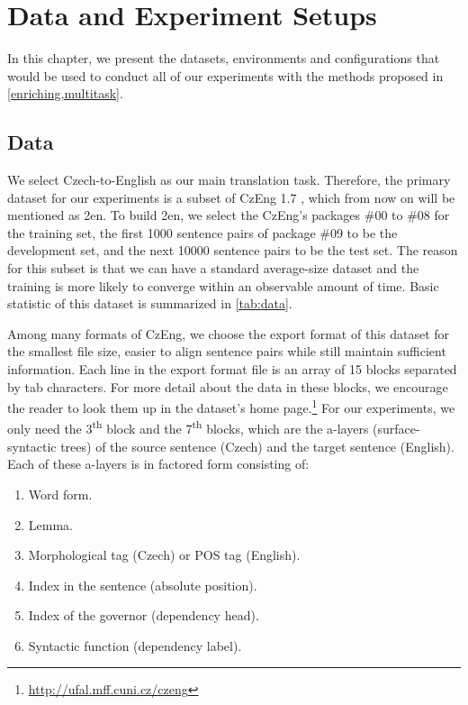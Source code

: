 \chapter{Data and Experiment Setups}
\label{dataexp}

In this chapter, we present the datasets, environments and configurations that would be used to conduct all of our experiments with the methods proposed in \cref{enriching,multitask}.

\section{Data}
\label{dataexp-data}

We select Czech-to-English as our main translation task.
Therefore, the primary dataset for our experiments is a subset of CzEng 1.7 , which from now on will be mentioned as \cs2en.
To build \cs2en, we select the CzEng's packages \#00 to \#08 for the training set, the first 1000 sentence pairs of package \#09 to be the development set, and the next 10000 sentence pairs to be the test set.
The reason for this subset is that we can have a standard average-size dataset and the training is more likely to converge within an observable amount of time. 
Basic statistic of this dataset is summarized in \cref{tab:data}.

Among many formats of CzEng, we choose the export format of this dataset for the smallest file size, easier to align sentence pairs while still maintain sufficient information. Each line in the export format file is an array of 15 blocks separated by tab characters. For more detail about the data in these blocks, we encourage the reader to look them up in the dataset's home page.\footnote{\url{http://ufal.mff.cuni.cz/czeng}} For our experiments, we only need the 3\textsuperscript{th} block and the 7\textsuperscript{th} blocks, which are the a-layers (surface-syntactic trees) of the source sentence (Czech) and the target sentence (English). Each of these a-layers is in factored form consisting of:

\begin{enumerate}
    \item Word form.
    \item Lemma.
    \item Morphological tag (Czech) or POS tag (English).
    \item Index in the sentence (absolute position).
    \item Index of the governor (dependency head).
    \item Syntactic function (dependency label).
\end{enumerate}

